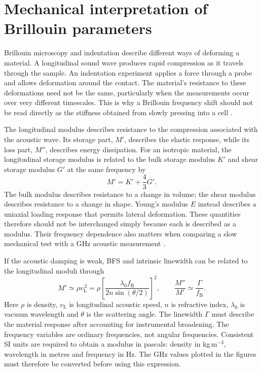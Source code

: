 \documentclass[11pt]{article}
\begin{document}

\clearpage
\appendix
\section{Mechanical interpretation of Brillouin parameters}
\label{app:mechanical_interpretation}

Brillouin microscopy and indentation describe different ways of deforming a material. A longitudinal sound wave produces rapid compression as it travels through the sample. An indentation experiment applies a force through a probe and allows deformation around the contact. The material's resistance to these deformations need not be the same, particularly when the measurements occur over very different timescales. This is why a Brillouin frequency shift should not be read directly as the stiffness obtained from slowly pressing into a cell \citep{bouvet2025}.

The longitudinal modulus describes resistance to the compression associated with the acoustic wave. Its storage part, $M'$, describes the elastic response, while its loss part, $M''$, describes energy dissipation. For an isotropic material, the longitudinal storage modulus is related to the bulk storage modulus $K'$ and shear storage modulus $G'$ at the same frequency by
\begin{equation}
 M'=K'+\frac{4}{3}G'.
 \label{eq:longitudinal_modulus_decomposition}
\end{equation}
The bulk modulus describes resistance to a change in volume; the shear modulus describes resistance to a change in shape. Young's modulus $E$ instead describes a uniaxial loading response that permits lateral deformation. These quantities therefore should not be interchanged simply because each is described as a modulus. Their frequency dependence also matters when comparing a slow mechanical test with a GHz acoustic measurement \citep{bouvet2025}.

If the acoustic damping is weak, BFS and intrinsic linewidth can be related to the longitudinal moduli through
\begin{equation}
 M'\simeq\rho v_{\mathrm L}^{\,2}
 =\rho\left[\frac{\lambda_0 f_{\mathrm B}}{2n\sin(\theta/2)}\right]^2,
 \qquad \frac{M''}{M'}\simeq\frac{\Gamma}{f_{\mathrm B}}.
 \label{eq:mechanical_moduli}
\end{equation}
Here $\rho$ is density, $v_{\mathrm L}$ is longitudinal acoustic speed, $n$ is refractive index, $\lambda_0$ is vacuum wavelength and $\theta$ is the scattering angle. The linewidth $\Gamma$ must describe the material response after accounting for instrumental broadening. The frequency variables are ordinary frequencies, not angular frequencies. Consistent SI units are required to obtain a modulus in pascals: density in kg\,m$^{-3}$, wavelength in metres and frequency in Hz. The GHz values plotted in the figures must therefore be converted before using this expression.
\end{document}
